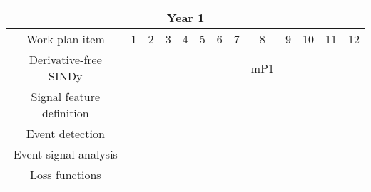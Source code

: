 \documentclass[a4paper,11pt]{scrartcl}
\begin{document}

\setlength\extrarowheight{3pt}
\begin{table}[h!]
    \centering
     \addtolength{\tabcolsep}{-3pt}
     \fontsize{10pt}{11pt}\selectfont
    \begin{tabular}{|c|c|c|c|c|c|c|c|c|c|c|c|c|}
    \hline
    \multicolumn{13}{|c|}{\cellcolor{gray!50} Year 1} \\
        \hline
        Work plan item & 1 & 2 & 3 & 4 & 5 & 6 & 7 & 8 & 9 & 10 & 11 & 12 \\
        \hline
        Derivative-free SINDy & \cellcolor{orange!25} & \cellcolor{orange!25} & \cellcolor{orange!25} & \cellcolor{orange!25} & \cellcolor{orange!25} & \cellcolor{orange!25} & \cellcolor{orange!25} & \cellcolor{orange!25} mP1 & & & & \\
        \hline
        Signal feature definition & & \cellcolor{blue!25} & \cellcolor{blue!25} & \cellcolor{blue!25} & & & & \cellcolor{blue!25} & \cellcolor{blue!25} & \cellcolor{blue!25} & \cellcolor{blue!25} & \\
        \hline
        Event detection & & & & \cellcolor{blue!25} & \cellcolor{blue!25} & \cellcolor{blue!25} & & & & \cellcolor{blue!25} & \cellcolor{blue!25} & \cellcolor{blue!25} \\
        \hline
        Event signal analysis & & & & & & \cellcolor{blue!25} & \cellcolor{blue!25} & \cellcolor{blue!25} & & & & \cellcolor{blue!25} \\
        \hline
        Loss functions & & & & & \cellcolor{purple!25} & \cellcolor{purple!25} & & & & & \cellcolor{purple!25} & \cellcolor{purple!25} \\
        

\end{tabular}
\end{table}
\end{document}
